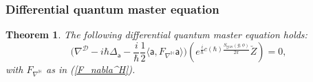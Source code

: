 \documentclass[11pt,a4paper]{amsart}
\theoremstyle{plain} %
\newtheorem{thm}{Theorem}[section]
\theoremstyle{definition}
\theoremstyle{remark}
\newcommand{\HH}{\mathbb{H}}
\newcommand{\mr}{\mathrm}
\newcommand{\sfa}{\mathsf{a}}
\newcommand{\mc}{\mathcal}
\begin{document}
{\subsubsection{Differential quantum master equation}
\begin{thm} \label{thm dQME on Zcheck}
The following differential quantum master equation holds:
    \begin{equation}\label{dQME on Zcheck}
        \Big(\nabla^\mc{D}
        -i\hbar \Delta_\sfa -\frac{i}{\hbar} \frac12 \langle\sfa, F_{\nabla^\HH}\sfa \rangle
        \Big) (e^{\frac{i}{\hbar} c(\hbar)\frac{S_\mr{grav}(g,\phi)}{2\pi}} \check{Z}) =0,
    \end{equation}
    with $F_{\nabla^\HH}$ as in (\ref{F_nabla^H}).
\end{thm}

}
\end{document}
